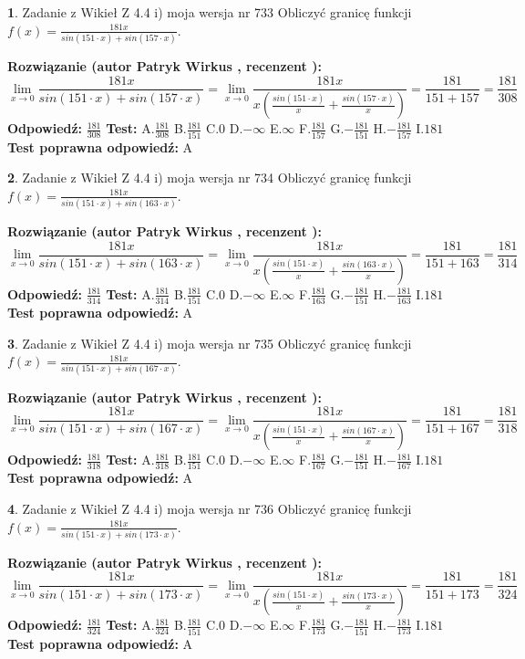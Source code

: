 \documentclass[12pt, a4paper]{article}
\theoremstyle{definition} %
\newtheorem{zad}{}
\newcommand{\zadStart}[1]{\begin{zad}#1\newline}
\newcommand{\zadStop}{\end{zad}}
\newcommand{\rozwStart}[2]{\noindent \textbf{Rozwiązanie (autor #1 , recenzent #2): }\newline}
\newcommand{\rozwStop}{\newline}
\newcommand{\odpStart}{\noindent \textbf{Odpowiedź:}\newline}
\newcommand{\odpStop}{\newline}
\newcommand{\testStart}{\noindent \textbf{Test:}\newline}
\newcommand{\testStop}{\newline}
\newcommand{\kluczStart}{\noindent \textbf{Test poprawna odpowiedź:}\newline}
\newcommand{\kluczStop}{\newline}
\begin{document}
\zadStart{Zadanie z Wikieł Z 4.4 i) moja wersja nr 733}
Obliczyć granicę funkcji $f(x)=\frac{181x}{sin(151\cdot x) +sin(157\cdot x)}$.
\zadStop
\rozwStart{Patryk Wirkus}{}
$$\lim\limits_{x\to 0}\frac{181x}{sin(151\cdot x) +sin(157\cdot x)}=\lim\limits_{x\to 0}\frac{181x}{x(\frac{sin(151\cdot x)}{x}+\frac{sin(157\cdot x)}{x})}=\frac{181}{151+157} = \frac{181}{308}$$
\rozwStop
\odpStart
$\frac{181}{308}$
\odpStop
\testStart
A.$\frac{181}{308}$
B.$\frac{181}{151}$
C.$0$
D.$-\infty$
E.$\infty$
F.$\frac{181}{157}$
G.$-\frac{181}{151}$
H.$-\frac{181}{157}$
I.$181$
\testStop
\kluczStart
A
\kluczStop



\zadStart{Zadanie z Wikieł Z 4.4 i) moja wersja nr 734}
Obliczyć granicę funkcji $f(x)=\frac{181x}{sin(151\cdot x) +sin(163\cdot x)}$.
\zadStop
\rozwStart{Patryk Wirkus}{}
$$\lim\limits_{x\to 0}\frac{181x}{sin(151\cdot x) +sin(163\cdot x)}=\lim\limits_{x\to 0}\frac{181x}{x(\frac{sin(151\cdot x)}{x}+\frac{sin(163\cdot x)}{x})}=\frac{181}{151+163} = \frac{181}{314}$$
\rozwStop
\odpStart
$\frac{181}{314}$
\odpStop
\testStart
A.$\frac{181}{314}$
B.$\frac{181}{151}$
C.$0$
D.$-\infty$
E.$\infty$
F.$\frac{181}{163}$
G.$-\frac{181}{151}$
H.$-\frac{181}{163}$
I.$181$
\testStop
\kluczStart
A
\kluczStop



\zadStart{Zadanie z Wikieł Z 4.4 i) moja wersja nr 735}
Obliczyć granicę funkcji $f(x)=\frac{181x}{sin(151\cdot x) +sin(167\cdot x)}$.
\zadStop
\rozwStart{Patryk Wirkus}{}
$$\lim\limits_{x\to 0}\frac{181x}{sin(151\cdot x) +sin(167\cdot x)}=\lim\limits_{x\to 0}\frac{181x}{x(\frac{sin(151\cdot x)}{x}+\frac{sin(167\cdot x)}{x})}=\frac{181}{151+167} = \frac{181}{318}$$
\rozwStop
\odpStart
$\frac{181}{318}$
\odpStop
\testStart
A.$\frac{181}{318}$
B.$\frac{181}{151}$
C.$0$
D.$-\infty$
E.$\infty$
F.$\frac{181}{167}$
G.$-\frac{181}{151}$
H.$-\frac{181}{167}$
I.$181$
\testStop
\kluczStart
A
\kluczStop



\zadStart{Zadanie z Wikieł Z 4.4 i) moja wersja nr 736}
Obliczyć granicę funkcji $f(x)=\frac{181x}{sin(151\cdot x) +sin(173\cdot x)}$.
\zadStop
\rozwStart{Patryk Wirkus}{}
$$\lim\limits_{x\to 0}\frac{181x}{sin(151\cdot x) +sin(173\cdot x)}=\lim\limits_{x\to 0}\frac{181x}{x(\frac{sin(151\cdot x)}{x}+\frac{sin(173\cdot x)}{x})}=\frac{181}{151+173} = \frac{181}{324}$$
\rozwStop
\odpStart
$\frac{181}{324}$
\odpStop
\testStart
A.$\frac{181}{324}$
B.$\frac{181}{151}$
C.$0$
D.$-\infty$
E.$\infty$
F.$\frac{181}{173}$
G.$-\frac{181}{151}$
H.$-\frac{181}{173}$
I.$181$
\testStop
\kluczStart
A
\kluczStop
\end{document}
